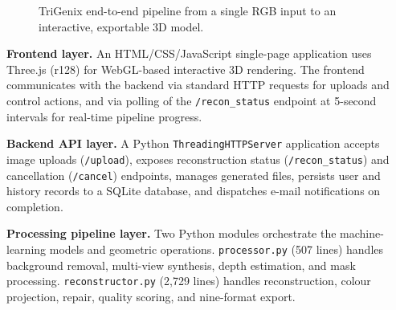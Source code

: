 \documentclass[conference]{IEEEtran}
\begin{document}
\begin{figure}[htbp]
\centering
{}
\caption{TriGenix end-to-end pipeline from a single RGB input to an interactive, exportable 3D model.}
\label{fig:arch}
\end{figure}

\textbf{Frontend layer.} An HTML/CSS/JavaScript single-page application uses Three.js (r128) for WebGL-based
interactive 3D rendering. The frontend communicates with the backend via standard HTTP requests for uploads
and control actions, and via polling of the \texttt{/recon\_status} endpoint at 5-second intervals for real-time pipeline progress.

\textbf{Backend API layer.} A Python \texttt{ThreadingHTTPServer} application accepts image uploads (\texttt{/upload}), exposes
reconstruction status (\texttt{/recon\_status}) and cancellation (\texttt{/cancel}) endpoints, manages
generated files, persists user and history records to a SQLite database, and dispatches e-mail notifications
on completion.

\textbf{Processing pipeline layer.} Two Python modules orchestrate the machine-learning models and geometric
operations. \texttt{processor.py} (507 lines) handles background removal, multi-view synthesis, depth estimation,
and mask processing. \texttt{reconstructor.py} (2,729 lines) handles reconstruction, colour projection, repair,
quality scoring, and nine-format export.
\end{document}
